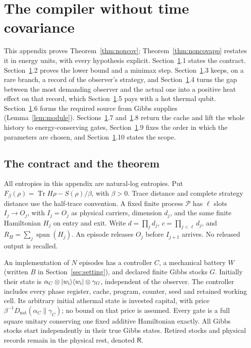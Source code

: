 \documentclass[11pt]{article}
\theoremstyle{definition}
\theoremstyle{remark}
\newcommand{\Tr}{\operatorname{Tr}}
\providecommand{\D}{D_{\mathrm{nat}}}
\begin{document}
\section{The compiler without time covariance}\label{app:noncov}

This appendix proves Theorem~\ref{thm:noncov}; Theorem~\ref{thm:noncovapp} restates it in energy units, with every hypothesis explicit. Section~\ref{app:noncov}.1 states the contract. Section~\ref{app:noncov}.2 proves the lower bound and a minimax step. Section~\ref{app:noncov}.3 keeps, on a rare branch, a record of the observer's strategy, and Section~\ref{app:noncov}.4 turns the gap between the most demanding observer and the actual one into a positive heat effect on that record, which Section~\ref{app:noncov}.5 pays with a hot thermal qubit. Section~\ref{app:noncov}.6 forms the required source from Gibbs supplies (Lemma~\ref{lem:module}). Sections~\ref{app:noncov}.7 and~\ref{app:noncov}.8 return the cache and lift the whole history to energy-conserving gates, Section~\ref{app:noncov}.9 fixes the order in which the parameters are chosen, and Section~\ref{app:noncov}.10 states the scope.

\subsection{The contract and the theorem}
All entropies in this appendix are natural-log entropies. Put
\(F_\beta(\rho)=\Tr H\rho-S(\rho)/\beta\), with \(\beta>0\).
Trace distance and complete strategy distance use the half-trace convention.
A fixed finite process \(\mathcal P\) has \(\ell\) slots
\(I_j\longrightarrow O_j\), with \(I_j=O_j\) as physical carriers,
dimension \(d_j\), and the same finite Hamiltonian \(H_j\) on entry and exit.
Write \(d=\prod_jd_j\), \(c=\prod_{j<\ell}d_j\), and
\(R_H=\sum_j\operatorname{span}(H_j)\). An episode releases \(O_j\) before
\(I_{j+1}\) arrives. No released output is recalled.

An implementation of \(N\) episodes has a controller \(C\), a mechanical
battery \(W\) (written \(B\) in Section~\ref{sec:setting}), and declared finite Gibbs stocks \(G\). Initially their state
is \(\alpha_C\otimes|w_{\rm i}\rangle\langle w_{\rm i}|\otimes\gamma_G\),
independent of the observer. The controller includes every phase register,
cache, program, counter, seed and retained working cell. Its arbitrary
initial athermal state is invested capital, with price
\(\beta^{-1}\D(\alpha_C\|\gamma_C)\); no bound on that price is assumed.
Every gate is a full square unitary conserving one fixed additive
Hamiltonian exactly. All Gibbs stocks start independently in their true
Gibbs states. Retired stocks and physical records remain in the physical
rest, denoted \(\mathsf R\).
\end{document}
